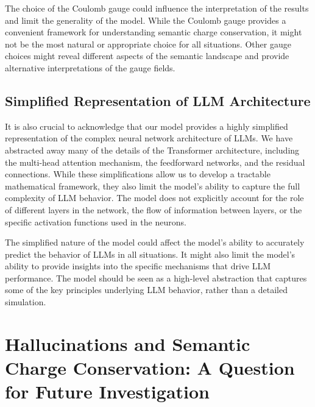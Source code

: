 \documentclass[prd,amsmath,amssymb,12pt]{revtex4}
\begin{document}
The choice of the Coulomb gauge could influence the interpretation of the
results and limit the generality of the model. While the Coulomb gauge
provides a convenient
framework for understanding semantic charge conservation, it might not be
the most natural or appropriate choice for all situations. Other gauge
choices might reveal different aspects of the semantic landscape and provide
alternative interpretations of the gauge fields.


\subsection{Simplified Representation of LLM Architecture}

It is also crucial to acknowledge that our model provides a highly
simplified representation of the complex neural network architecture of
LLMs. We have abstracted away many of the details of the Transformer architecture,
including the multi-head attention mechanism, the feedforward networks,
and the residual connections. While these simplifications allow us to develop
a tractable mathematical framework, they also limit the model's ability to
capture the full complexity of LLM behavior. The model does not explicitly
account for the role of different layers in the network, the flow of information
between layers, or the specific activation functions used in the neurons.

The simplified nature of the model could affect the model's ability to accurately
predict the behavior of LLMs in all situations. It might also limit the model's ability
to provide insights into the specific mechanisms that drive LLM performance.
The model should be seen as a high-level abstraction that captures some of the
key principles underlying LLM behavior, rather than a detailed simulation.

\section{Hallucinations and Semantic Charge Conservation: A Question for Future Investigation}
\end{document}
